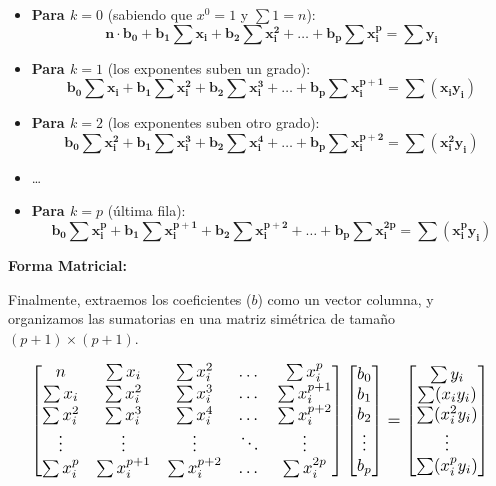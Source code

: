 \documentclass[11pt,a4paper]{article}
\begin{document}
\begin{itemize}
    \item \textbf{Para $k = 0$} (sabiendo que $x^0 = 1$ y $\sum 1 = n$):
    \[ \mathbf{n \cdot b_0 + b_1 \sum x_i + b_2 \sum x_i^2 + \dots + b_p \sum x_i^p = \sum y_i} \]
    
    \item \textbf{Para $k = 1$} (los exponentes suben un grado):
    \[ \mathbf{b_0 \sum x_i + b_1 \sum x_i^2 + b_2 \sum x_i^3 + \dots + b_p \sum x_i^{p+1} = \sum (x_i y_i)} \]
    
    \item \textbf{Para $k = 2$} (los exponentes suben otro grado):
    \[ \mathbf{b_0 \sum x_i^2 + b_1 \sum x_i^3 + b_2 \sum x_i^4 + \dots + b_p \sum x_i^{p+2} = \sum (x_i^2 y_i)} \]
    
    \item \dots
    
    \item \textbf{Para $k = p$} (última fila):
    \[ \mathbf{b_0 \sum x_i^p + b_1 \sum x_i^{p+1} + b_2 \sum x_i^{p+2} + \dots + b_p \sum x_i^{2p} = \sum (x_i^p y_i)} \]
\end{itemize}

\vspace{0.8cm}
\noindent \textbf{Forma Matricial:}

Finalmente, extraemos los coeficientes ($b$) como un vector columna, y organizamos las sumatorias en una matriz simétrica de tamaño $(p+1) \times (p+1)$. 

\[
\resizebox{0.95\textwidth}{!}{$\displaystyle
\begin{bmatrix}
n & \sum x_i & \sum x_i^2 & \dots & \sum x_i^p \\
\sum x_i & \sum x_i^2 & \sum x_i^3 & \dots & \sum x_i^{p+1} \\
\sum x_i^2 & \sum x_i^3 & \sum x_i^4 & \dots & \sum x_i^{p+2} \\
\vdots & \vdots & \vdots & \ddots & \vdots \\
\sum x_i^p & \sum x_i^{p+1} & \sum x_i^{p+2} & \dots & \sum x_i^{2p}
\end{bmatrix}
\begin{bmatrix}
b_0 \\
b_1 \\
b_2 \\
\vdots \\
b_p
\end{bmatrix}
=
\begin{bmatrix}
\sum y_i \\
\sum (x_i y_i) \\
\sum (x_i^2 y_i) \\
\vdots \\
\sum (x_i^p y_i)
\end{bmatrix}
$}
\]
\end{document}
